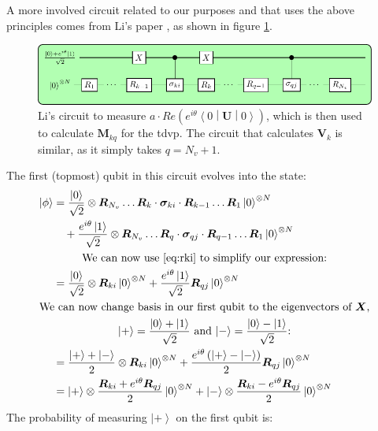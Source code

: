 \documentclass{aux/ttuthes2007}
\newcommand{\ket}[1]{\ensuremath{\left|#1\right\rangle}}
\newcommand{\sandwich}[3]{\left< #1 \middle\vert #2 \middle\vert #3 \right>}
\newcommand{\paren}[1]{\left( #1 \right)}
\newcommand{\elec}{N}
\begin{document}
%
A more involved circuit related to our purposes and that uses the above principles comes from Li's paper , as shown in figure \ref{fig:circuitbenjamin}.
%
\begin{figure}[ht!]
  \includegraphics[width=\linewidth]{circuits/circuit2.pdf}
  \caption[Li's circuit]{Li's circuit to measure $a \cdot Re\paren{e^{i\theta}\sandwich 0 {\bm U} 0}$, which is then used to calculate $\bm M_{kq}$ for the \gls{tdvp}. The circuit that calculates $\bm V_k$ is similar, as it simply takes $q = N_v + 1$.}
  \label{fig:circuitbenjamin}
\end{figure}
%
The first (topmost) qubit in this circuit evolves into the state:
%
\begin{equation*}
	\begin{split}
		\ket \phi 
		&= \frac{\ket 0}{\sqrt 2} \otimes \bm R_{N_v} \ldots \bm R_k \cdot \bm \sigma_{ki} \cdot \bm R_{k-1} \ldots \bm R_1 \ket 0^{\otimes \elec}\\
		&\quad + \frac{e^{i\theta}\ket 1}{\sqrt 2} \otimes \bm R_{N_v} \ldots \bm R_q \cdot \bm \sigma_{qj} \cdot \bm R_{q-1} \ldots \bm R_1 \ket 0^{\otimes \elec}\\
		\span\text{We can now use \ref{eq:rki} to simplify our expression:}\\
		&= \frac{\ket 0}{\sqrt 2} \otimes \bm R_{ki} \ket 0^{\otimes \elec}
		+ \frac{e^{i\theta}\ket 1}{\sqrt 2} \bm R_{qj}\ket 0^{\otimes \elec}\\
		\span\text{We can now change basis in our first qubit to the eigenvectors of $\bm X$,}
		\\
		\span\text{$\ket + = \frac{\ket 0 + \ket 1}{\sqrt 2}$
		and
		$\ket - = \frac{\ket 0 - \ket 1}{\sqrt 2}$:}\\
		&= \frac{\ket + + \ket -}{2} \otimes \bm R_{ki} \ket 0^{\otimes \elec}
		+ \frac{e^{i\theta}\paren{\ket + - \ket -}}{2} \bm R_{qj}\ket 0^{\otimes \elec}\\
		&= \ket + \otimes \frac{\bm R_{ki} + e^{i\theta}\bm R_{qj}}{2} \ket 0^{\otimes \elec}
		 + \ket - \otimes \frac{\bm R_{ki} - e^{i\theta}\bm R_{qj}}{2} \ket 0^{\otimes \elec}
	\end{split}
\end{equation*}
The probability of measuring $\ket +$ on the first qubit is:
\end{document}
